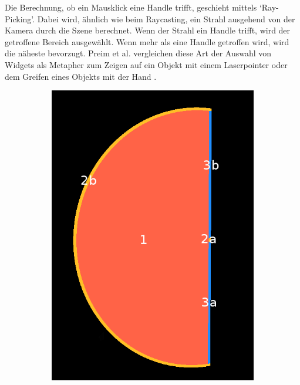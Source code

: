 \documentclass[a4paper,fontsize=12pt,toc=bib,halfparskip]{scrartcl}
\begin{document}
Die Berechnung, ob ein Mausklick eine Handle trifft, geschieht mittels `Ray-Picking'. Dabei wird, \"ahnlich wie beim Raycasting, ein Strahl ausgehend von der Kamera durch die Szene berechnet. Wenn der Strahl ein Handle trifft, wird der getroffene Bereich ausgew\"ahlt.  Wenn mehr als eine Handle getroffen wird, wird die n\"aheste bevorzugt. Preim et al. vergleichen diese Art der Auswahl von Widgets als Metapher zum Zeigen auf ein Objekt mit einem Laserpointer oder dem Greifen eines Objekts mit der Hand \cite[344]{preim2015interaktive}.

\begin{figure}
	\hspace*{\fill}
	\begin{subfigure}{0.2\textwidth}
		\includegraphics[width=\textwidth]{pictures/InteractionPlane.png}
		\subcaption{}
		\label{InteractionPlaneA}
	\end{subfigure}

\end{figure}
\end{document}
